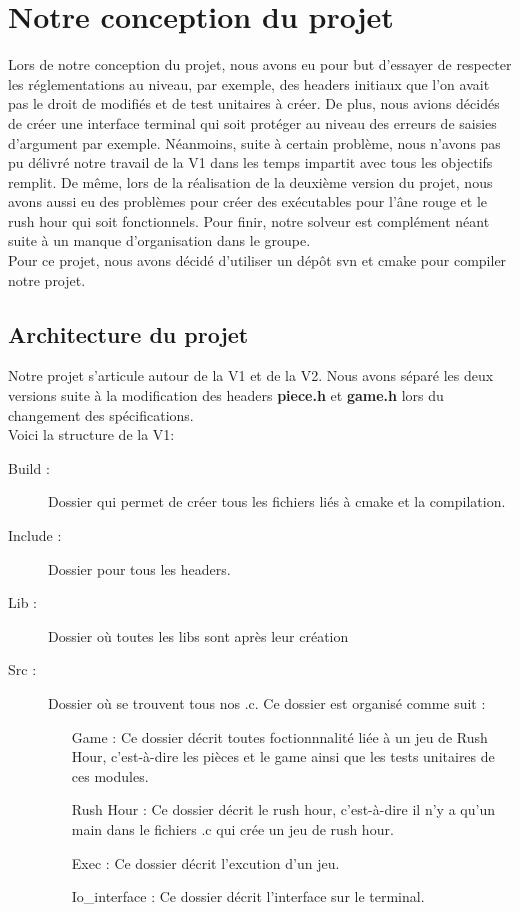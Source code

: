 \documentclass{report}
\begin{document}
\chapter{Notre conception du projet}
\setcounter{section}{0}
Lors de notre conception du projet, nous avons eu pour but d'essayer de respecter les réglementations au niveau, par exemple, des headers initiaux que l'on avait pas le droit de modifiés et de test unitaires  à créer. De plus, nous avions décidés de créer une interface terminal qui soit protéger au niveau des erreurs de saisies d'argument par exemple. Néanmoins, suite à certain problème, nous n'avons pas pu délivré notre travail de la V1 dans les temps impartit avec tous les objectifs remplit. De même, lors de la réalisation de la deuxième version du projet, nous avons aussi eu des problèmes pour créer des exécutables pour l'âne rouge et le rush hour qui soit fonctionnels. Pour finir, notre solveur est complément néant suite à un manque d'organisation dans le groupe.\\
Pour ce projet, nous avons décidé d'utiliser un dépôt svn et cmake pour compiler notre projet.

\section{Architecture du projet}
Notre projet s'articule autour de la V1 et de la V2. Nous avons séparé les deux versions suite à la modification des headers \textbf{piece.h} et \textbf{game.h} lors du changement des spécifications.\\
Voici la structure de la V1:
\begin{description}
\item [Build :] Dossier qui permet de créer tous les fichiers liés à cmake et la compilation.
\item [Include :] Dossier pour tous les headers.
\item [Lib :] Dossier où toutes les libs sont après leur création
\item [Src :] Dossier où se trouvent tous nos .c. Ce dossier est organisé comme suit :
  \begin{itemize}
  \item [Game :] Ce dossier décrit toutes foctionnnalité liée à un jeu de Rush Hour, c'est-à-dire les pièces et le game ainsi que les tests unitaires de ces modules.
  \item [Rush Hour :] Ce dossier décrit le rush hour, c'est-à-dire il n'y a qu'un main dans le fichiers .c qui crée un jeu de rush hour. 
  \item [Exec :] Ce dossier décrit l'excution d'un jeu.
  \item [Io\_interface :] Ce dossier décrit l'interface sur le terminal.
  \end{itemize}
\end{description}
\end{document}
